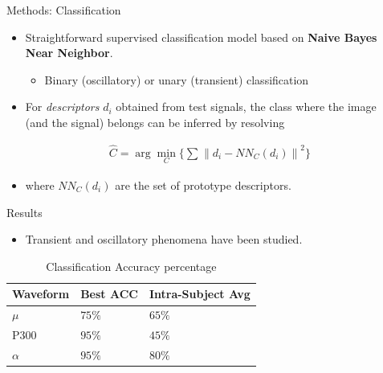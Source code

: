 \documentclass[final,hyperref={pdfpagelabels=false}]{beamer}
\begin{document}
\begin{frame}[t]
\begin{columns}[t]
\begin{column}{.03\textwidth}\end{column} %
 
\begin{column}{.465\textwidth} %


\begin{block}{Methods: Classification}

\begin{itemize}
\item Straightforward supervised classification model based on \textbf{Naive Bayes Near Neighbor}.
\begin{itemize}
\item Binary (oscillatory) or unary (transient) classification
\end{itemize}
\item For \textit{descriptors} $ d_i $ obtained from test signals, the class where the image (and the signal) belongs can be inferred by resolving

\begin{align*}
\hat{C} = \arg \min_C \big\{\sum_{}^{} \left\lVert d_i - NN_C(d_i) \right\rVert ^2 \big\}
\end{align*}

\item where $NN_C(d_i)$ are the set of prototype descriptors.
\end{itemize}

\end{block}

\begin{block}{Results}

\begin{itemize}
\item Transient and oscillatory phenomena have been studied.
\end{itemize}

\begin{table}
\begin{tabular}{l l l}
\toprule
\textbf{Waveform} & \textbf{Best ACC} & \textbf{Intra-Subject Avg}\\
\midrule
$\mu$ & $75\%$ & $65\%$ \\
P300  & $95\%$ & $45\%$ \\
$\alpha$  & $95\%$ & $80\%$ \\
\bottomrule
\end{tabular}
\caption{Classification Accuracy percentage}
\end{table}


\end{block}
\end{column}
\end{columns}
\end{frame}
\end{document}
